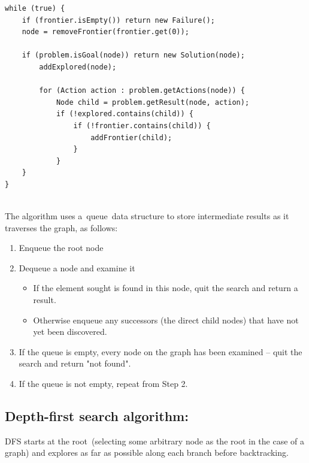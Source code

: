 \documentclass[a4paper]{article}
\begin{document}
\begin{lstlisting}
while (true) {
    if (frontier.isEmpty()) return new Failure();
    node = removeFrontier(frontier.get(0));

    if (problem.isGoal(node)) return new Solution(node);
        addExplored(node);

        for (Action action : problem.getActions(node)) {
            Node child = problem.getResult(node, action);
            if (!explored.contains(child)) {
                if (!frontier.contains(child)) {
                    addFrontier(child);
                }
            }
    }
}
\end{lstlisting}

\noindent \\
The algorithm uses a queue data structure to store intermediate results as it traverses the graph, as follows:\\

\begin{enumerate}
\item Enqueue the root node
\item Dequeue a node and examine it
	\begin{itemize}
		\item If the element sought is found in this node, quit the search and return a result.
		\item Otherwise enqueue any successors (the direct child nodes) that have not yet been discovered.
	\end{itemize}
\item If the queue is empty, every node on the graph has been examined – quit the search and return "not found". \\
\item If the queue is not empty, repeat from Step 2.
\end{enumerate}


\subsection{Depth-first search algorithm:}

DFS starts at the root (selecting some arbitrary node as the root in the case of a graph) and explores as far as possible along each branch before backtracking.
\end{document}
